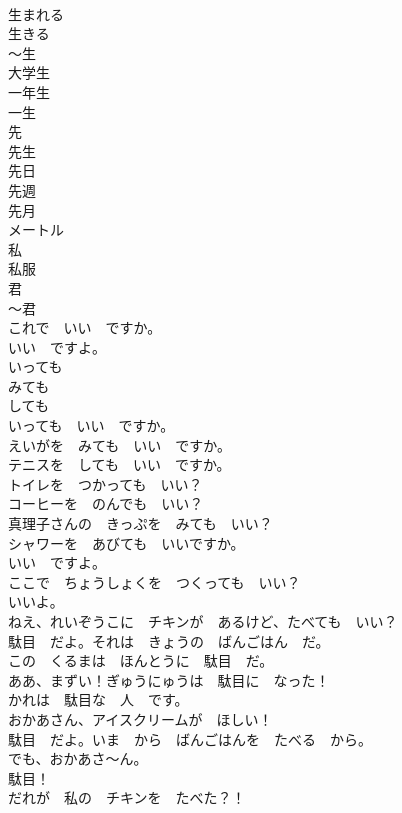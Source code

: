 \documentclass[8pt]{extreport}
\begin{document}
\begin{CJK}{UTF8}{min}
\\	生まれる	
\\	生きる	
\\	～生	
\\	大学生	
\\	一年生	
\\	一生	
\\	先	
\\	先生	
\\	先日	
\\	先週	
\\	先月	
\\	メートル	
\\	私	
\\	私服	
\\	君	
\\	～君	
\\	これで　いい　ですか。	
\\	いい　ですよ。	
\\	いっても	
\\	みても	
\\	しても	
\\	いっても　いい　ですか。	
\\	えいがを　みても　いい　ですか。	
\\	テニスを　しても　いい　ですか。	
\\	トイレを　つかっても　いい？	
\\	コーヒーを　のんでも　いい？	
\\	真理子さんの　きっぷを　みても　いい？	
\\	シャワーを　あびても　いいですか。	
\\	いい　ですよ。	
\\	ここで　ちょうしょくを　つくっても　いい？	
\\	いいよ。	
\\	ねえ、れいぞうこに　チキンが　あるけど、たべても　いい？	
\\	駄目　だよ。それは　きょうの　ばんごはん　だ。	
\\	この　くるまは　ほんとうに　駄目　だ。	
\\	ああ、まずい！ぎゅうにゅうは　駄目に　なった！	
\\	かれは　駄目な　人　です。	
\\	おかあさん、アイスクリームが　ほしい！	
\\	駄目　だよ。いま　から　ばんごはんを　たべる　から。	
\\	でも、おかあさ～ん。	
\\	駄目！	
\\	だれが　私の　チキンを　たべた？！	

\end{CJK}
\end{document}
